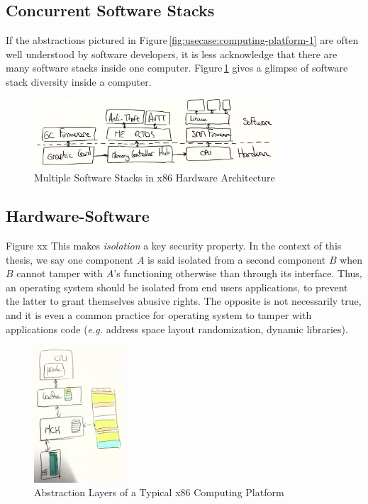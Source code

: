 \subsection{Concurrent Software Stacks}

If the abstractions pictured in Figure\,\ref{fig:usecase:computing-platform-1}
are often well understood by software developers, it is less acknowledge that
there are many software stacks inside one computer.
%
Figure\,\ref{fig:usecase:computing-platform-2} gives a glimpse of software stack
diversity inside a computer.

\begin{figure}
  \centering
  \includegraphics[width=0.8\textwidth]{Figures/intro-computing-platform.jpg}
  \caption{Multiple Software Stacks in x86 Hardware Architecture}
  \label{fig:usecase:computing-platform-2}
\end{figure}

\subsection{Hardware-Software}

Figure xx
%
This makes \emph{isolation} a key security property.
%
In the context of this thesis, we say one component $A$ is said isolated from
a second component $B$ when $B$ cannot tamper with $A$'s functioning otherwise
than through its interface.
%
Thus, an operating system should be isolated from end users applications, to
prevent the latter to grant themselves abusive rights.
%
The opposite is not necessarily true, and it is even a common practice for
operating system to tamper with applications code (\emph{e.g.} address space
layout randomization, dynamic libraries).

\begin{figure}
  \centering
  \includegraphics[width=0.3\textwidth]{Figures/computing-platform-3.jpg}
  \caption{Abstraction Layers of a Typical x86 Computing Platform}
  \label{fig:usecase:computing-platform-3}
\end{figure}

